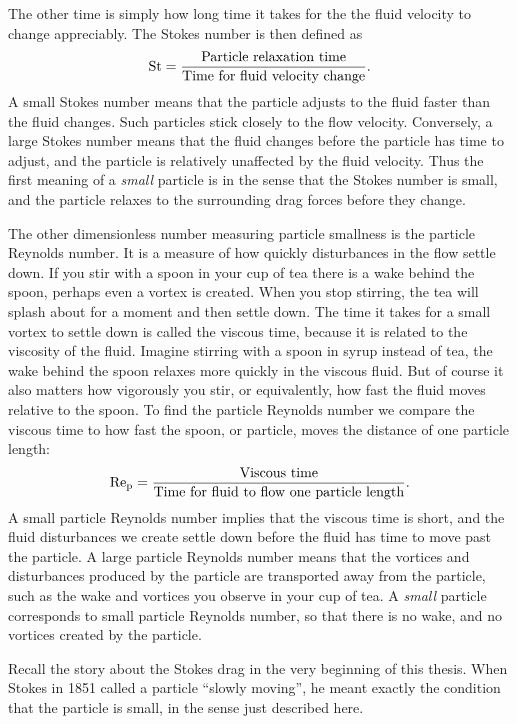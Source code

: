 \documentclass[thesis.tex]{subfiles}
\begin{document}
The other time is simply how long time it takes for the the fluid velocity to change appreciably. The Stokes number is then defined as
\begin{align*}
 	\mbox{St} = \frac{\textrm{Particle relaxation time}}{\textrm{Time for fluid velocity change}}.
 \end{align*} 
A small Stokes number means that the particle adjusts to the fluid faster than the fluid changes. Such particles stick closely to the flow velocity. Conversely, a large Stokes number means that the fluid changes before the particle has time to adjust, and the particle is relatively unaffected by the fluid velocity. Thus the first meaning of a \emph{small} particle is in the sense that the Stokes number is small, and the particle relaxes to the surrounding drag forces before they change.

The other dimensionless number measuring particle smallness is the particle Reynolds number. It is a measure of how quickly disturbances in the flow settle down. If you stir with a spoon in your cup of tea there is a wake behind the spoon, perhaps even a vortex is created. When you stop stirring, the tea will splash about for a moment and then settle down. The time it takes for a small vortex to settle down is called the viscous time, because it is related to the viscosity of the fluid. Imagine stirring with a spoon in syrup instead of tea, the wake behind the spoon relaxes more quickly in the viscous fluid. But of course it also matters how vigorously you stir, or equivalently, how fast the fluid moves relative to the spoon. To find the particle Reynolds number we compare the viscous time to how fast the spoon, or particle, moves the distance of one particle length:
\begin{align*}
 	\mbox{Re}_{\mathrm p} = \frac{\textrm{Viscous time}}{\textrm{Time for fluid to flow one particle length}}.
 \end{align*} 
A small particle Reynolds number implies that the viscous time is short, and the fluid disturbances we create settle down before the fluid has time to move past the particle. A large particle Reynolds number means that the vortices and disturbances produced by the particle are transported away from the particle, such as the wake and vortices you observe in your cup of tea. A \emph{small} particle corresponds to small particle Reynolds number, so that there is no wake, and no vortices created by the particle. 

Recall the story about the Stokes drag in the very beginning of this thesis. When Stokes in 1851 called a particle ``slowly moving'', he meant exactly the condition that the particle is small, in the sense just described here.
\end{document}

